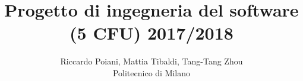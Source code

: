 \documentclass[a4paper]{article}
\begin{document}
\title{Progetto di ingegneria del software (5 CFU) 2017/2018}
\author{
        Riccardo Poiani, Mattia Tibaldi, Tang-Tang Zhou \\
        Politecnico di Milano\\  
}
\maketitle
\newpage
\tableofcontents
{}
\newpage



\newpage



\newpage



\newpage



\newpage



\newpage




\end{document}
